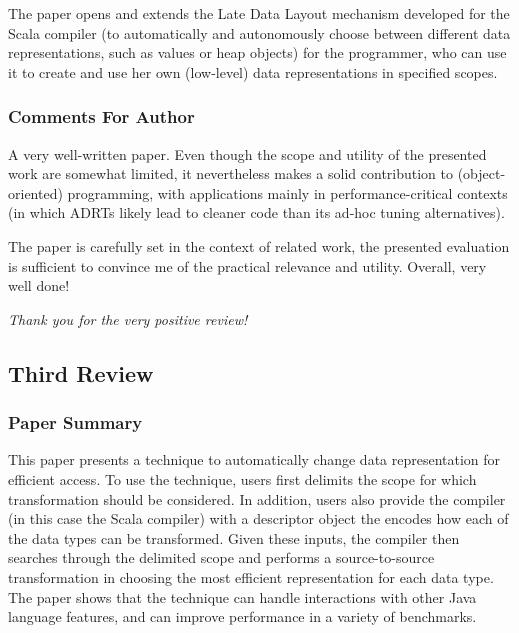 \documentclass[9pt]{article}
\newenvironment{reviewer-addr}
{ \color{OliveGreen} \framebox{{\bf FEEDBACK}} }
{  }
\newenvironment{answer}
{ \em \framebox{{\bf AUTHOR RESPONSE}} }
{  }
\begin{document}
The paper opens and extends the Late Data Layout mechanism developed for the Scala compiler (to automatically and autonomously choose between different data representations, such as values or heap objects) for the programmer, who can use it to create and use her own (low-level) data representations in specified scopes.

\vspace{5mm}

\subsubsection{Comments For Author}

\begin{reviewer-addr}
A very well-written paper. Even though the scope and utility of the presented work are somewhat limited, it nevertheless makes a solid contribution to (object-oriented) programming, with applications mainly in performance-critical contexts (in which ADRTs likely lead to cleaner code than its ad-hoc tuning alternatives).
\vspace{5mm}

The paper is carefully set in the context of related work, the presented evaluation is sufficient to convince me of the practical relevance and utility. Overall, very well done!
\end{reviewer-addr}

\begin{answer}
Thank you for the very positive review!
\end{answer}











\newpage

\subsection{Third Review}

\subsubsection{Paper Summary}

This paper presents a technique to automatically change data representation for efficient access. To use the technique, users first delimits the scope for which transformation should be considered. In addition, users also provide the compiler (in this case the Scala compiler) with a descriptor object the encodes how each of the data types can be transformed. Given these inputs, the compiler then searches through the delimited scope and performs a source-to-source transformation in choosing the most efficient representation for each data type. The paper shows that the technique can handle interactions with other Java language features, and can improve performance in a variety of benchmarks.
\end{document}
